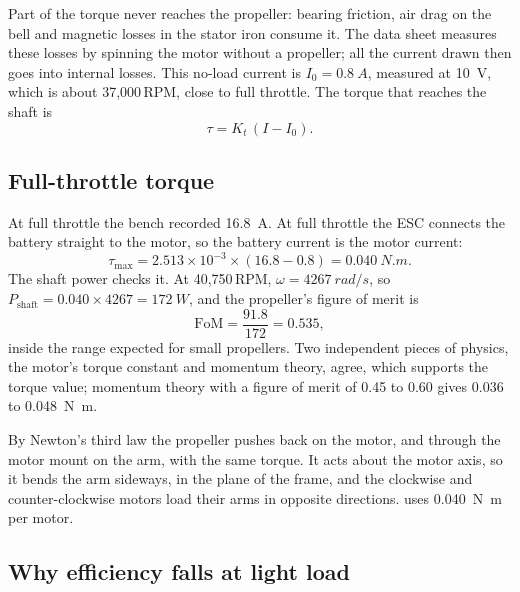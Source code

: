 Part of the torque never reaches the propeller: bearing friction, air drag on the bell and magnetic losses in the stator iron consume it. The data sheet measures these losses by spinning the motor without a propeller; all the current drawn then goes into internal losses. This no-load current is $I_0 = \SI{0.8}{A}$, measured at \SI{10}{V}, which is about 37,000\,RPM, close to full throttle. The torque that reaches the shaft is
\begin{equation}
\tau = K_t\,(I - I_0).
\end{equation}

\subsection{Full-throttle torque}

At full throttle the bench recorded \SI{16.8}{A}. At full throttle the ESC connects the battery straight to the motor, so the battery current is the motor current:
\begin{equation}
\tau_\text{max} = 2.513\times10^{-3} \times (16.8 - 0.8) = \SI{0.040}{N.m}.
\end{equation}
The shaft power checks it. At 40,750\,RPM, $\omega = \SI{4267}{rad/s}$, so $P_\text{shaft} = 0.040 \times 4267 = \SI{172}{W}$, and the propeller's figure of merit is
\begin{equation}
\text{FoM} = \frac{91.8}{172} = 0.535,
\end{equation}
inside the range expected for small propellers. Two independent pieces of physics, the motor's torque constant and momentum theory, agree, which supports the torque value; momentum theory with a figure of merit of 0.45 to 0.60 gives 0.036 to \SI{0.048}{N.m}.

By Newton's third law the propeller pushes back on the motor, and through the motor mount on the arm, with the same torque. It acts about the motor axis, so it bends the arm sideways, in the plane of the frame, and the clockwise and counter-clockwise motors load their arms in opposite directions.  uses \SI{0.040}{N.m} per motor.

\subsection{Why efficiency falls at light load}

